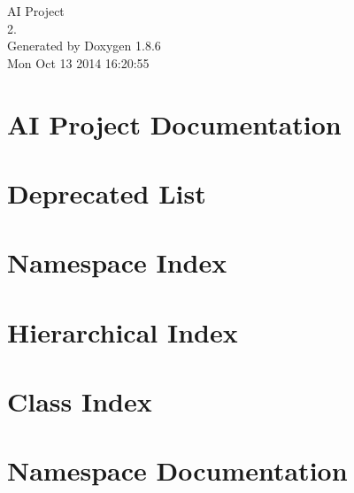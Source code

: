 \documentclass[twoside]{book}
\newcommand{\clearemptydoublepage}{%
  \newpage{\pagestyle{empty}\cleardoublepage}%
}
\begin{document}
\hypersetup{pageanchor=false}
\begin{titlepage}
\vspace*{7cm}
\begin{center}%
{\Large A\-I Project \\[1ex]\large 2. }\\
\vspace*{1cm}
{\large Generated by Doxygen 1.8.6}\\
\vspace*{0.5cm}
{\small Mon Oct 13 2014 16:20:55}\\
\end{center}
\end{titlepage}
\clearemptydoublepage
\tableofcontents
\clearemptydoublepage
{}
\hypersetup{pageanchor=true}

\chapter{A\-I Project Documentation}
\label{index}\hypertarget{index}{}
\chapter{Deprecated List}
\label{deprecated}
\hypertarget{deprecated}{}

\chapter{Namespace Index}

\chapter{Hierarchical Index}

\chapter{Class Index}

\chapter{Namespace Documentation}

\end{document}
